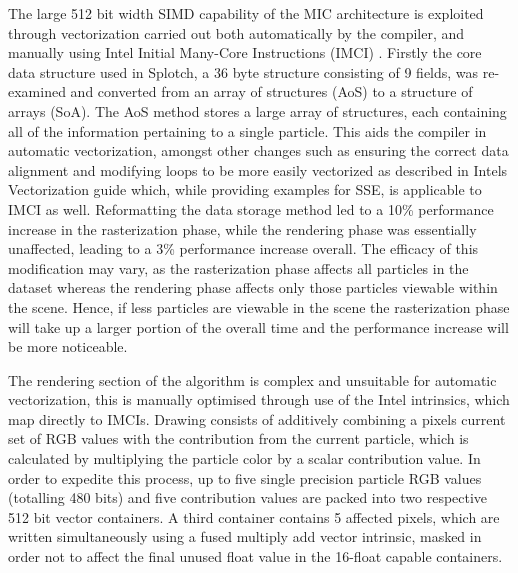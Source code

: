 \documentclass[runningheads,a4paper]{llncs}
\begin{document}
The large 512 bit width SIMD capability of the MIC architecture is exploited through vectorization carried out both 
automatically by the compiler, and manually using Intel Initial Many-Core Instructions (IMCI) \cite{imci}. Firstly the 
core data structure used in Splotch, a 36 byte structure consisting of 9 fields, was re-examined and converted from an 
array of structures (AoS) to a structure of arrays (SoA). The AoS method stores a large array of structures, each containing 
all of the information pertaining to a single particle. This aids the compiler in automatic vectorization, 
amongst other changes such as ensuring the correct data alignment and modifying loops to be more easily vectorized 
as described in Intels Vectorization guide \cite{vectorguide} which, while providing examples for SSE, is applicable 
to IMCI as well. Reformatting the data storage method led to a 10\% performance increase in the rasterization phase, 
while the rendering phase was essentially unaffected, leading to a 3\% performance increase overall. The efficacy of 
this modification may vary, as the rasterization phase affects all particles in the dataset whereas the rendering phase 
affects only those particles viewable within the scene. Hence, if less particles are viewable in the scene the rasterization 
phase will take up a larger portion of the overall time and the performance increase will be more noticeable.

The rendering section of the algorithm is complex and unsuitable for automatic vectorization, this is manually 
optimised through use of the Intel intrinsics, which map directly to IMCIs. Drawing consists of additively 
combining a pixels current set of RGB values with the contribution from the current particle, which is calculated by 
multiplying the particle color by a scalar contribution value. In order to expedite this process, up to five single 
precision particle RGB values (totalling 480 bits) and five contribution values are packed into two respective 
512 bit vector containers. A third container contains 5 affected pixels, which are written simultaneously using a 
fused multiply add vector intrinsic, masked in order not to affect the final unused float value in the 16-float 
capable containers.
\end{document}
